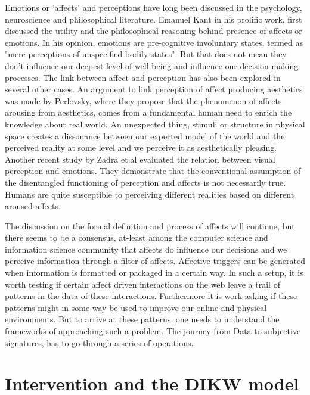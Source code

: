 Emotions or `affects' and perceptions have long been discussed in the psychology, neuroscience and philosophical literature. Emanuel Kant in his prolific work, first discussed the utility and the philosophical reasoning behind presence of affects or emotions\cite{kant1987critique}. In his opinion, emotions are pre-cognitive involuntary states, termed as "mere perceptions of unspecified bodily states"\cite{borges2004can}. But that does not mean they don't influence our deepest level of well-being and influence our decision making processes.
The link between affect and perception has also been explored in several other cases. An argument to link perception of affect producing aesthetics was made by Perlovsky\cite{perlovsky2014aesthetic}, where they propose that the phenomenon of affects arousing from aesthetics, comes from a fundamental human need to enrich the knowledge about real world. An unexpected thing, stimuli or structure in physical space creates a dissonance between our expected model of the world and the perceived reality at some level and we perceive it as aesthetically pleasing. Another recent study by Zadra et.al\cite{zadra2011emotion} evaluated the relation between visual perception and emotions. They demonstrate that the conventional assumption of the disentangled functioning of perception and affects is not necessarily true. Humans are quite susceptible to perceiving different realities based on different aroused affects. 

The discussion on the formal definition and process of affects will continue, but there seems to be a consensus, at-least among the computer science and information science community that affects do influence our decisions and we perceive information through a filter of affects. Affective triggers can be generated when information is formatted or packaged in a certain way. In such a setup, it is worth testing if certain affect driven interactions on the web leave a trail of patterns in the data of these interactions. Furthermore it is work asking if these patterns might in some way be used to improve our online and physical environments. But to arrive at these patterns, one needs to understand the frameworks of approaching such a problem. The journey from Data to subjective signatures, has to go through a series of operations. 

\section{Intervention and the DIKW model}

